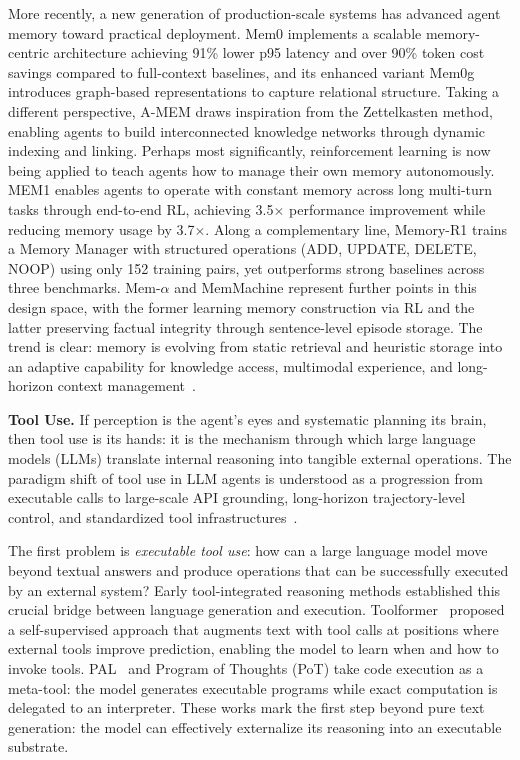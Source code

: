 More recently, a new generation of production-scale systems has advanced agent memory toward practical deployment. Mem0 \cite{chhikara2025mem0} implements a scalable memory-centric architecture achieving 91\% lower p95 latency and over 90\% token cost savings compared to full-context baselines, and its enhanced variant Mem0g introduces graph-based representations to capture relational structure. Taking a different perspective, A-MEM \cite{xu2026mem} draws inspiration from the Zettelkasten method, enabling agents to build interconnected knowledge networks through dynamic indexing and linking. Perhaps most significantly, reinforcement learning is now being applied to teach agents how to manage their own memory autonomously. MEM1 \cite{zhou2025mem1} enables agents to operate with constant memory across long multi-turn tasks through end-to-end RL, achieving 3.5$\times$ performance improvement while reducing memory usage by 3.7$\times$. Along a complementary line, Memory-R1 \cite{yan2025memory} trains a Memory Manager with structured operations (ADD, UPDATE, DELETE, NOOP) using only 152 training pairs, yet outperforms strong baselines across three benchmarks. Mem-$\alpha$ \cite{wang2025mem} and MemMachine \cite{wang2026memmachine} represent further points in this design space, with the former learning memory construction via RL and the latter preserving factual integrity through sentence-level episode storage. The trend is clear: memory is evolving from static retrieval and heuristic storage into an adaptive capability for knowledge access, multimodal experience, and long-horizon context management~\citep{applis2025unified,lai2024autowebglm,patel2024large,thil2024navigating,anupam2025browserarena}.

\textbf{Tool Use.} If perception is the agent's eyes and systematic planning its brain, then tool use is its hands: it is the mechanism through which large language models (LLMs) translate internal reasoning into tangible external operations. The paradigm shift of tool use in LLM agents is understood as a progression from executable calls to large-scale API grounding, long-horizon trajectory-level control, and standardized tool infrastructures~\citep{chae2025web,krupp2025quantifying,xu2025turkingbench,murty2024nnetnav,lu2024weblinx,wang2024executable,chen2023fireact}.

The first problem is \emph{executable tool use}: how can a large language model move beyond textual answers and produce operations that can be successfully executed by an external system? Early tool-integrated reasoning methods established this crucial bridge between language generation and execution. Toolformer~\cite{schick2023toolformer} proposed a self-supervised approach that augments text with tool calls at positions where external tools improve prediction, enabling the model to learn when and how to invoke tools. PAL~\cite{gao2023pal} and Program of Thoughts (PoT)\cite{chen2022program} take code execution as a meta-tool: the model generates executable programs while exact computation is delegated to an interpreter. These works mark the first step beyond pure text generation: the model can effectively externalize its reasoning into an executable substrate\citep{cai2025large,song2025bearcubs,zhang2024large,caples2026real,bhathal2025websight}.

